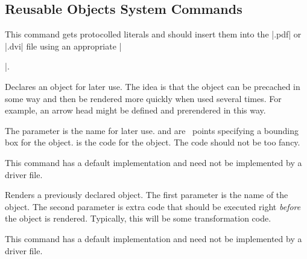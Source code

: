 \begin{command}{\pgfsys@rdf@resource{}}
\end{command}

\begin{command}{\pgfsys@rdf@rev{}}
\end{command}

\begin{command}{\pgfsys@rdf@src{}}
\end{command}

\begin{command}{\pgfsys@rdf@typeof{}}
\end{command}

\begin{command}{\pgfsys@rdf@vocab{}}
\end{command}



\subsection{Reusable Objects System Commands}

\begin{command}{\pgfsys@invoke{}}
  This command gets protocolled literals and should insert them into
  the |.pdf| or |.dvi| file using an appropriate |\special|.
\end{command}

\begin{command}{\pgfsys@defobject{}}
  Declares an object for later use. The idea is that the object can be
  precached in some way and then be rendered more quickly when used
  several times. For example, an arrow head might be defined and
  prerendered in this way.

  The parameter  is the name for later use.  and  are \pgfname\ points specifying a bounding
  box for the object.  is the code for the object. The code
  should not be too fancy.

  This command has a default implementation and need not be
  implemented by a driver file.
\end{command}

\begin{command}{\pgfsys@useobject{}}
  Renders a previously declared object. The first parameter is the
  name of the object. The second parameter is extra code that
  should be executed right \emph{before} the object is
  rendered. Typically, this will be some transformation code.

  This command has a default implementation and need not be
  implemented by a driver file.
\end{command}



